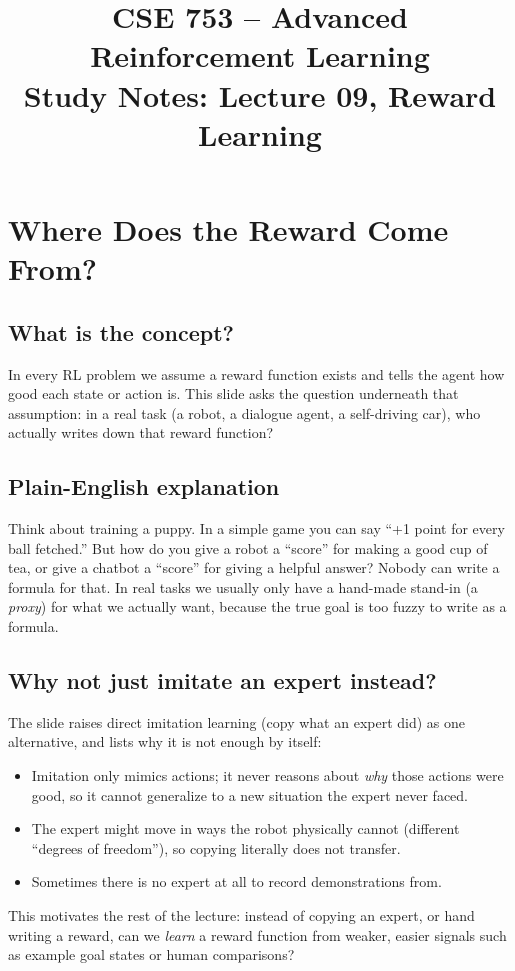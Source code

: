 \documentclass[11pt]{article}
\title{CSE 753 -- Advanced Reinforcement Learning \\ Study Notes: Lecture 09, Reward Learning}
\author{}
\date{}
\begin{document}
\maketitle

\bigskip

\section{Where Does the Reward Come From?}

\subsection{What is the concept?}
In every RL problem we assume a reward function exists and tells the agent how
good each state or action is. This slide asks the question underneath that
assumption: in a real task (a robot, a dialogue agent, a self-driving car), who
actually writes down that reward function?

\subsection{Plain-English explanation}
Think about training a puppy. In a simple game you can say ``+1 point for every
ball fetched.'' But how do you give a robot a ``score'' for making a good cup of
tea, or give a chatbot a ``score'' for giving a helpful answer? Nobody can write a
formula for that. In real tasks we usually only have a hand-made stand-in
(a \emph{proxy}) for what we actually want, because the true goal is too fuzzy to
write as a formula.

\subsection{Why not just imitate an expert instead?}
The slide raises direct imitation learning (copy what an expert did) as one
alternative, and lists why it is not enough by itself:
\begin{itemize}
  \item Imitation only mimics actions; it never reasons about \emph{why} those
  actions were good, so it cannot generalize to a new situation the expert never
  faced.
  \item The expert might move in ways the robot physically cannot (different
  ``degrees of freedom''), so copying literally does not transfer.
  \item Sometimes there is no expert at all to record demonstrations from.
\end{itemize}
This motivates the rest of the lecture: instead of copying an expert, or hand
writing a reward, can we \emph{learn} a reward function from weaker, easier
signals such as example goal states or human comparisons?
\end{document}
